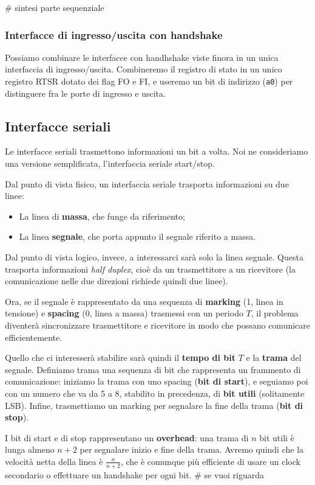 \documentclass[a4paper,11pt]{article}
\begin{document}
# sintesi parte sequenziale

\subsubsection{Interfacce di ingresso/uscita con handshake}
Possiamo combinare le interfacce con handhshake viste finora in un unica interfaccia di ingresso/uscita.
Combineremo il registro di stato in un unico registro RTSR dotato dei flag FO e FI, e useremo un bit di indirizzo (\lstinline|a0|) per distinguere fra le porte di ingresso e uscita. 

\subsection{Interfacce seriali}
Le interfacce seriali trasmettono informazioni un bit a volta.
Noi ne consideriamo una versione semplificata, l'interfaccia seriale start/stop.

Dal punto di vista fisico, un interfaccia seriale trasporta informazioni su due linee:
\begin{itemize}
	\item La linea di \textbf{massa}, che funge da riferimento;
	\item La linea \textbf{segnale}, che porta appunto il segnale riferito a massa.
\end{itemize}

Dal punto di vista logico, invece, a interessarci sarà solo la linea segnale.
Questa trasporta informazioni \textit{half duplex}, cioè da un trasmettitore a un ricevitore (la comunicazione nelle due direzioni richiede quindi due linee).

Ora, se il segnale è rappresentato da una sequenza di \textbf{marking} (1, linea in tensione) e \textbf{spacing} (0, linea a massa) trasmessi con un periodo $T$, il problema diventerà sincronizzare trasmettitore e ricevitore in modo che possano comunicare efficientemente. 

Quello che ci interesserà stabilire sarà quindi il \textbf{tempo di bit} $T$ e la \textbf{trama} del segnale.
Definiamo trama una sequenza di bit che rappresenta un frammento di comunicazione: iniziamo la trama con uno spacing (\textbf{bit di start}), e seguiamo poi con un numero che va da 5 a 8, stabilito in precedenza, di \textbf{bit utili} (solitamente LSB).
Infine, trasmettiamo un marking per segnalare la fine della trama (\textbf{bit di stop}).

I bit di start e di stop rappresentano un \textbf{overhead}: una trama di $n$ bit utili è lunga almeno $n+2$ per segnalare inizio e fine della trama.
Avremo quindi che la velocità netta della linea è $\frac{n}{n+2}$, che è comunque più efficiente di usare un clock secondario o effettuare un handshake per ogni bit. # se vuoi riguarda
\end{document}
